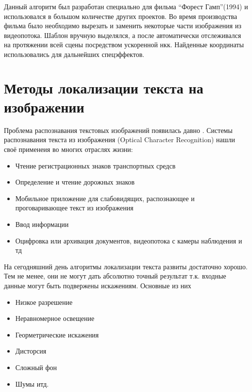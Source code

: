 \documentclass[oneside,final,14pt]{extreport}
\begin{document}
Данный алгоритм был разработан специально для фильма “Форест Гамп”(1994) и использовался в большом количестве других проектов. Во время производства фильма было необходимо вырезать и заменить некоторые части изображения из видеопотока. Шаблон вручную выделялся, а после автоматически отслеживался на протяжении всей сцены посредством ускоренной нкк. Найденные координаты использовались для дальнейших спецэффектов.

\chapter{Методы локализации текста на изображении}
Проблема распознавания текстовых изображений появилась давно \cite{JDAR_survey}. Системы распознавания текста из изображения (Optical Character Recognition) нашли своё применеия во многих отраслях жизни:

\begin{itemize}[label= $-$, noitemsep]
\item Чтение регистрационных знаков транспортных средсв
\item Определение и чтение дорожных знаков

\item Мобильное приложение для слабовидящих, распознающее и проговаривающее текст из изображения

\item Ввод информации

\item Оцифровка или архивация документов, видеопотока с камеры наблюдения и тд

\end{itemize}

На сегодняшний день алгоритмы локализации текста развиты достаточно хорошо. Тем не менее, они не могут дать абсолютно точный результат т.к. входные данные могут быть подвержены искажениям. Основные из них

\begin{itemize}[label= $-$, noitemsep]
\item Низкое разрешение 


\item Неравномерное освещение

\item Георметрические искажения

\item Дисторсия

\item Сложный фон

\item Шумы итд.

\end{itemize}
\end{document}
